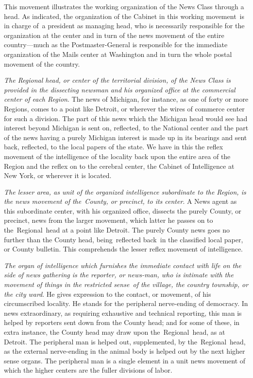 \documentclass[openany,nobib]{tufte-book}
\begin{document}
This movement illustrates the working organization of the News Class
through a head. As indicated, the organization of the Cabinet in this
working movement~is in charge of~a president as managing head, who is
necessarily responsible for the organization at the center and in turn
of the news movement of the entire country---much as the
Postmaster-General is responsible for the immediate organization of the
Mails center at Washington and in turn the whole postal movement of the
country.~

\vspace{0.05in}

\emph{The Regional head, or center of the territorial division, of the
News Class is provided in the dissecting newsman and his organized
office at the commercial center of each Region}. The news of Michigan,
for instance, as one of forty or more Regions, comes to a point like
Detroit, or wherever the wires of commerce center for such a division.
The part of this news which the Michigan head would see had interest
beyond Michigan is sent on, reflected, to the National center and the
part of the news having a purely Michigan interest is made up in its
bearings and sent back, reflected, to the local papers of the state. We
have in this the reflex movement of the intelligence of the locality
back upon the entire area of the Region and the reflex on to the
cerebral center, the Cabinet of Intelligence at New York, or wherever it
is located.~

\vspace{0.05in}

\emph{The lesser area, as unit of the organized intelligence subordinate
to the Region, is the news movement of the~County, or precinct, to its
center}. A News agent as this subordinate center, with his organized
office, dissects the purely County, or precinct, news from the larger
movement, which latter he passes on to the~Regional~head at a point like
Detroit. The purely County news goes no further than the County head,
being~reflected back~in the classified local paper, or County bulletin.
This comprehends the lesser reflex movement of intelligence.~

\vspace{0.05in}

\emph{The organ of intelligence which furnishes the immediate contact
with life on the side of news gathering is the reporter, or news-man,
who is intimate with the movement of things in the restricted sense~of
the village, the country township, or the city ward}. He gives
expression to the contact, or movement, of his circumscribed locality.
He stands for the peripheral nerve-ending of democracy. In news
extraordinary, as requiring exhaustive and technical reporting, this man
is helped by reporters sent down from the County head; and for some of
these, in extra instance, the County head may draw upon
the~Regional~head, as at Detroit. The peripheral man is helped out,
supplemented, by the~Regional~head, as the external nerve-ending in the
animal body is helped out by the next higher sense organs. The
peripheral man is a single element in a unit news movement of which the
higher centers are the fuller divisions of labor.~
\end{document}
